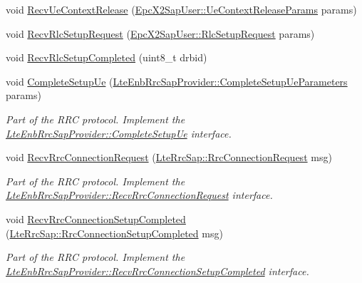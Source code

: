 \begin{DoxyCompactItemize}
void \hyperlink{classns3_1_1UeManager_a09e6e92b47575fa170d0b0e4d149c31d}{Recv\+Ue\+Context\+Release} (\hyperlink{structns3_1_1EpcX2Sap_1_1UeContextReleaseParams}{Epc\+X2\+Sap\+User\+::\+Ue\+Context\+Release\+Params} params)
\item 
void \hyperlink{classns3_1_1UeManager_a52d52fa9ab13eecfc3ccf82262e03e1c}{Recv\+Rlc\+Setup\+Request} (\hyperlink{structns3_1_1EpcX2Sap_1_1RlcSetupRequest}{Epc\+X2\+Sap\+User\+::\+Rlc\+Setup\+Request} params)
\item 
void \hyperlink{classns3_1_1UeManager_a2a4a5b37119d8d2fdc1493eda96247f1}{Recv\+Rlc\+Setup\+Completed} (uint8\+\_\+t drbid)
\item 
void \hyperlink{classns3_1_1UeManager_a29ae16f2a383c0761f907de0973c56ee}{Complete\+Setup\+Ue} (\hyperlink{structns3_1_1LteEnbRrcSapProvider_1_1CompleteSetupUeParameters}{Lte\+Enb\+Rrc\+Sap\+Provider\+::\+Complete\+Setup\+Ue\+Parameters} params)
\begin{DoxyCompactList}\small\item\em Part of the R\+RC protocol. Implement the \hyperlink{classns3_1_1LteEnbRrcSapProvider_acc43a1e7e8a4a6f5e6645066e9253060}{Lte\+Enb\+Rrc\+Sap\+Provider\+::\+Complete\+Setup\+Ue} interface. \end{DoxyCompactList}\item 
void \hyperlink{classns3_1_1UeManager_af0959818ae542240ccf1caa2b3da19ab}{Recv\+Rrc\+Connection\+Request} (\hyperlink{structns3_1_1LteRrcSap_1_1RrcConnectionRequest}{Lte\+Rrc\+Sap\+::\+Rrc\+Connection\+Request} msg)
\begin{DoxyCompactList}\small\item\em Part of the R\+RC protocol. Implement the \hyperlink{classns3_1_1LteEnbRrcSapProvider_a6a49a245760fe748a1e959e92c9cc313}{Lte\+Enb\+Rrc\+Sap\+Provider\+::\+Recv\+Rrc\+Connection\+Request} interface. \end{DoxyCompactList}\item 
void \hyperlink{classns3_1_1UeManager_a603086a2beb1901cad3f30c6bfd32544}{Recv\+Rrc\+Connection\+Setup\+Completed} (\hyperlink{structns3_1_1LteRrcSap_1_1RrcConnectionSetupCompleted}{Lte\+Rrc\+Sap\+::\+Rrc\+Connection\+Setup\+Completed} msg)
\begin{DoxyCompactList}\small\item\em Part of the R\+RC protocol. Implement the \hyperlink{classns3_1_1LteEnbRrcSapProvider_aa167fea38bb3d88f6c87a4fbfbb2669e}{Lte\+Enb\+Rrc\+Sap\+Provider\+::\+Recv\+Rrc\+Connection\+Setup\+Completed} interface. \end{DoxyCompactList}\item 

\end{DoxyCompactItemize}
